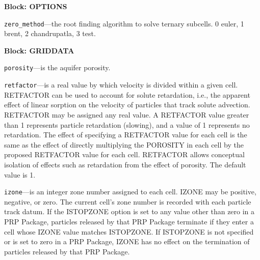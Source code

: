 
\item \textbf{Block: OPTIONS}

\begin{description}
\item \texttt{zero\_method}---the root finding algorithm to solve ternary subcells.  0 euler, 1 brent, 2 chandrupatla, 3 test.

\end{description}
\item \textbf{Block: GRIDDATA}

\begin{description}
\item \texttt{porosity}---is the aquifer porosity.

\item \texttt{retfactor}---is a real value by which velocity is divided within a given cell.  RETFACTOR can be used to account for solute retardation, i.e., the apparent effect of linear sorption on the velocity of particles that track solute advection.  RETFACTOR may be assigned any real value.  A RETFACTOR value greater than 1 represents particle retardation (slowing), and a value of 1 represents no retardation.  The effect of specifying a RETFACTOR value for each cell is the same as the effect of directly multiplying the POROSITY in each cell by the proposed RETFACTOR value for each cell.  RETFACTOR allows conceptual isolation of effects such as retardation from the effect of porosity.  The default value is 1.

\item \texttt{izone}---is an integer zone number assigned to each cell.  IZONE may be positive, negative, or zero.  The current cell's zone number is recorded with each particle track datum.  If the ISTOPZONE option is set to any value other than zero in a PRP Package, particles released by that PRP Package terminate if they enter a cell whose IZONE value matches ISTOPZONE.  If ISTOPZONE is not specified or is set to zero in a PRP Package, IZONE has no effect on the termination of particles released by that PRP Package.

\end{description}


